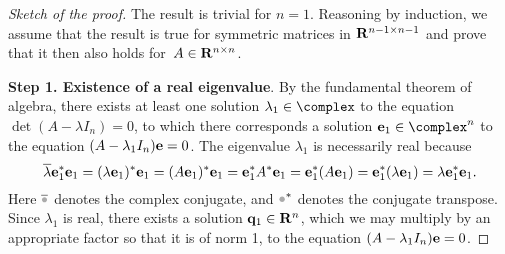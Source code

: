 \begin{proof}
    [Sketch of the proof]
    The result is trivial for $n = 1$.
    Reasoning by induction,
    we assume that the result is true for symmetric matrices in $\mathbf R^{n-1 \times n-1}$
    and prove that it then also holds for~$A \in \mathbf R^{n \times n}$.

            \vspace{.3cm}
            \textbf{Step 1. Existence of a real eigenvalue}.
            By the fundamental theorem of algebra,
            there exists at least one solution $\lambda_1 \in \complex$ to the equation $\det(A - \lambda I_n) = 0$,
            to which there corresponds a solution $\vect e_1 \in \complex^n$ to the equation $(A - \lambda_1 I_n) \mathbf e = 0$.
            The eigenvalue $\lambda_1$ is necessarily real because
            \[
                \overline \lambda \mathbf e_1^* \mathbf e_1
                = (\lambda \mathbf e_1)^* \mathbf e_1
                = (A \mathbf e_1)^* \mathbf e_1
                = \mathbf e_1^* A^* \mathbf e_1
                = \mathbf e_1^* (A \mathbf e_1)
                = \mathbf e_1^* (\lambda \mathbf e_1)
                = \lambda \mathbf e_1^* \mathbf e_1.
            \]
            Here $\overline \placeholder$ denotes the complex conjugate,
            and $\placeholder^*$ denotes the conjugate transpose.
            Since $\lambda_1$ is real, there exists a solution $\mathbf q_1 \in \mathbf R^n$,
            which we may multiply by an appropriate factor so that
            it is of norm 1,
            to the equation $(A - \lambda_1 I_n) \mathbf e = 0$.


\end{proof}
